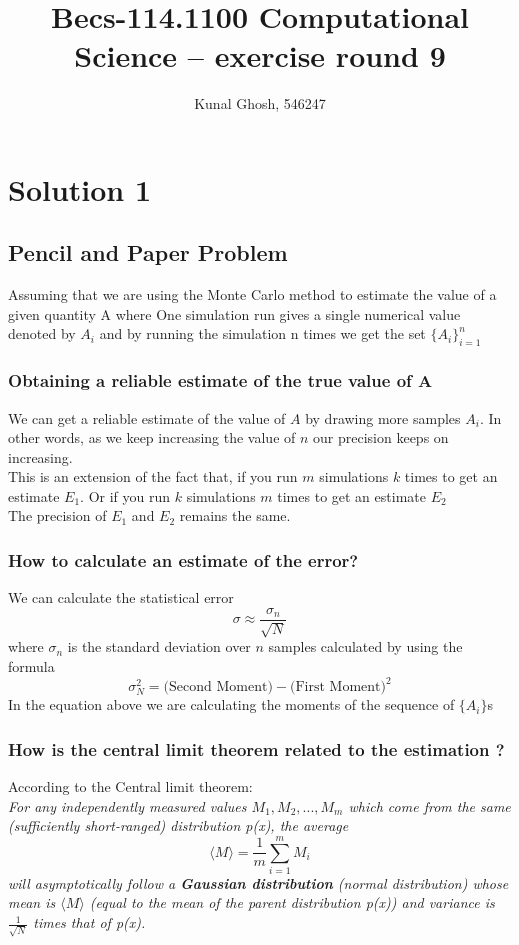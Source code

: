 \documentclass[a4paper,11pt]{article}
\begin{document}
\title{Becs-114.1100 Computational Science -- exercise round 9} %
\author{Kunal Ghosh, 546247} %
\maketitle
\section{Solution 1}
\subsection{Pencil and Paper Problem}
Assuming that we are using the Monte Carlo method to estimate the value of a given quantity A where One simulation run gives a single numerical value denoted by $A_{i}$ and by running the simulation n times we get the set $\{A_{i}\}_{i=1}^{n}$
\subsubsection{Obtaining a reliable estimate of the true value of A}
We can get a reliable estimate of the value of $A$ by drawing more samples $A_{i}$. In other words, as we keep increasing the value of $n$ our precision keeps on increasing.\\
This is an extension of the fact that, if you run $m$ simulations $k$ times to get an estimate $E_{1}$. Or if you run $k$ simulations $m$ times to get an estimate $E_{2}$\\The precision of $E_{1}$ and $E_{2}$ remains the same.
\subsubsection{How to calculate an estimate of the error?}
We can calculate the statistical error 
\begin{equation}
    \sigma \approx \frac{\sigma_{n}}{\sqrt{N}}    
\end{equation}
where $\sigma_{n}$ is the standard deviation over $n$ samples calculated by using the formula 
\begin{equation}
\sigma_{N}^{2} = \text{(Second Moment)} - \text{(First Moment)}^{2}
\end{equation}
In the equation above we are calculating the moments of the sequence of $\{A_{i}\}$s
\subsubsection{How is the central limit theorem related to the estimation ?}
According to the Central limit theorem:
\\
\textit{For any independently measured values $M_{1},M_{2},...,M_{m}$ which come from the same (sufficiently short-ranged) distribution p(x), the average 
\begin{equation}
    \langle M \rangle  = \frac{1}{m}\sum_{i=1}^{m}M_{i}
\end{equation}
will asymptotically follow a \textbf{Gaussian distribution} (normal distribution) whose mean is $\langle M \rangle$ (equal to the mean of the parent distribution p(x)) and variance is $\frac{1}{\sqrt{N}}$ times that of p(x).}
\end{document}
